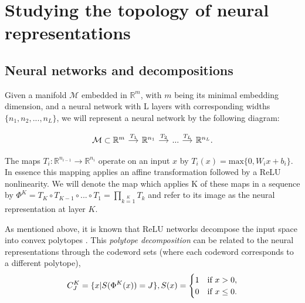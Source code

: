 \section{Studying the topology of neural representations}
\subsection{Neural networks and decompositions}
Given a manifold $\mathcal{M}$ embedded in $\mathbb{R}^m$, with $m$ being its minimal embedding dimension, and a neural network with L layers with corresponding widths $\{n_1,n_2,...,n_L\}$, we will represent a neural network by the following diagram:

\begin{equation}
    \begin{tikzcd}[row sep=small,column sep=small]
        \mathcal{M} \subset \mathbb{R}^m \arrow[r, "T_1"] & \mathbb{R}^{n_1} \arrow[r, "T_2"] & ... \arrow[r, "T_L"] & \mathbb{R}^{n_L}.
    \end{tikzcd}
\end{equation}

The maps $T_i: \mathbb{R}^{n_{i-1}} \to \mathbb{R}^{n_i}$ operate on an input $x$ by $T_i(x) = \text{max}\{0,W_ix+b_i\}$. In essence this mapping applies an affine transformation followed by a ReLU nonlinearity. We will denote the map which applies K of these maps in a sequence by $\Phi^K = T_K \circ T_{K-1} \circ ... \circ T_{1} = \prod\limits_{k=1}\limits^{K}T_k$ and refer to its image as the neural representation at layer $K$.

As mentioned above, it is known that ReLU networks decompose the input space into convex polytopes \cite{huchette2023deep, balestriero2019geometry}. This \textit{polytope decomposition} can be related to the neural representations through the codeword sets (where each codeword corresponds to a different polytope), 
\begin{equation}
C_J^K = \{x | S(\Phi^K(x)) = J\},\\
 S(x) =
\begin{cases}
    1 & \text{if } x > 0, \\
    0 & \text{if } x \leq 0.
\end{cases}
\end{equation}

